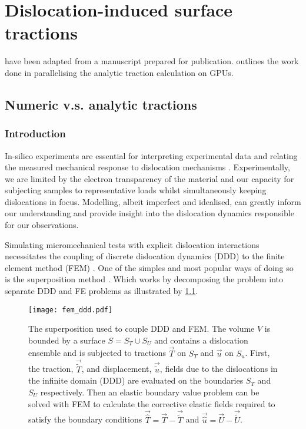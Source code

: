\chapter{Dislocation-induced surface tractions}
\label{c:tractions}

 have been adapted from a manuscript prepared for publication.  outlines the work done in parallelising the analytic traction calculation on GPUs.

\section{Numeric v.s. analytic tractions}\label{s:numericVsAnalytic}

\subsection{Introduction}\label{ss:paperIntro}

In-silico experiments are essential for interpreting experimental data and relating the measured mechanical response to dislocation mechanisms \cite{0965-0393-6-6-007,doi:10.1080/14786430500341250,tarleton2015discrete,YU2018}. Experimentally, we are limited by the electron transparency of the material and our capacity for subjecting samples to representative loads whilst simultaneously keeping dislocations in focus. Modelling, albeit imperfect and idealised, can greatly inform our understanding and provide insight into the dislocation dynamics responsible for our observations.

Simulating micromechanical tests with explicit dislocation interactions necessitates the coupling of discrete dislocation dynamics (DDD) to the finite element method (FEM) \cite{Groh2009}. One of the simples and most popular ways of doing so is the superposition method \cite{superposition_scheme0,superposition_scheme1,superposition_scheme2}. Which works by decomposing the problem into separate DDD and FE problems as illustrated by \cref{f:superposition_scheme}.
\begin{figure}
    \centering
    \texttt{[image: fem\_ddd.pdf]}
    \caption[Superposition Model for DDD-FEM coupling.]{The superposition used to couple DDD and FEM. The volume $V$ is bounded by a surface $S = S_{T} \cup S_{U}$ and contains a dislocation ensemble and is subjected to tractions $\vec{T}$ on $S_{T}$ and $\vec{u}$ on $S_{u}$. First, the traction, $\vec{\tilde{T}}$, and displacement, $\vec{\tilde{u}}$, fields due to the dislocations in the infinite domain (DDD) are evaluated on the boundaries $S_{T}$ and $S_{U}$ respectively. Then an elastic boundary value problem can be solved with FEM to calculate the corrective elastic fields required to satisfy the boundary conditions $\vec{\hat{T}} = \vec{T} - \vec{\tilde{T}}$ and $\vec{\hat{u}} = \vec{U} - \vec{\tilde{U}}$.}
    \label{f:superposition_scheme}
\end{figure}

